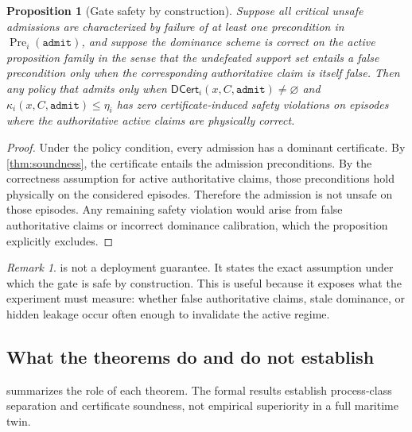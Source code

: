 \documentclass[11pt]{article}
\newcommand{\DCert}{\mathsf{DCert}}
\newcommand{\1}{\mathbf{1}}
\theoremstyle{definition}
\theoremstyle{plain}
\newtheorem{proposition}[definition]{Proposition}
\theoremstyle{remark}
\newtheorem{remark}[definition]{Remark}
\begin{document}
\begin{proposition}[Gate safety by construction]
\label{prop:gate-safety}
Suppose all critical unsafe admissions are characterized by failure of at least one precondition in $\operatorname{Pre}_i(\texttt{admit})$, and suppose the dominance scheme is correct on the active proposition family in the sense that the undefeated support set entails a false precondition only when the corresponding authoritative claim is itself false. Then any policy that admits only when $\DCert_i(x,C,\texttt{admit})\neq\varnothing$ and $\kappa_i(x,C,\texttt{admit})\le \eta_i$ has zero certificate-induced safety violations on episodes where the authoritative active claims are physically correct.
\end{proposition}

\begin{proof}
Under the policy condition, every admission has a dominant certificate. By \cref{thm:soundness}, the certificate entails the admission preconditions. By the correctness assumption for active authoritative claims, those preconditions hold physically on the considered episodes. Therefore the admission is not unsafe on those episodes. Any remaining safety violation would arise from false authoritative claims or incorrect dominance calibration, which the proposition explicitly excludes.
\end{proof}

\begin{remark}
 is not a deployment guarantee. It states the exact assumption under which the gate is safe by construction. This is useful because it exposes what the experiment must measure: whether false authoritative claims, stale dominance, or hidden leakage occur often enough to invalidate the active regime.
\end{remark}

\subsection{What the theorems do and do not establish}

 summarizes the role of each theorem. The formal results establish process-class separation and certificate soundness, not empirical superiority in a full maritime twin.
\end{document}
